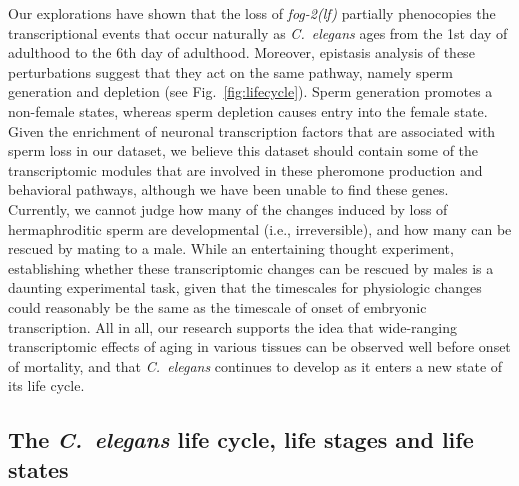 \documentclass[10pt,letterpaper,twocolumn]{article}
\newcommand{\cel}{\emph{C.~elegans}}
\newcommand{\fog}{\emph{\mbox{fog-2(lf)}}}
\begin{document}
Our explorations have shown that the loss of \fog{} partially phenocopies the
transcriptional events that occur naturally as \cel{} ages from the 1st day of
adulthood to the 6th day of adulthood. Moreover, epistasis analysis of these
perturbations suggest that they act on the same pathway, namely sperm generation
and depletion (see Fig.~\ref{fig:lifecycle}). Sperm generation promotes a non-female
states, whereas sperm depletion causes entry into the female state. Given the
enrichment of neuronal transcription factors that are associated with sperm loss
in our dataset, we believe this dataset should contain some of the transcriptomic
modules that are involved in these pheromone production and behavioral pathways,
although we have been unable to find these genes. Currently, we cannot judge how
many of the changes induced by loss of hermaphroditic sperm are developmental
(i.e., irreversible), and how many can be rescued by mating to a male.
While an entertaining thought experiment, establishing whether these transcriptomic
changes can be rescued by males is a daunting experimental task, given that the
timescales for physiologic changes could reasonably be the same as the timescale
of onset of embryonic transcription. All in all, our research supports the idea
that wide-ranging transcriptomic effects of aging in various tissues can be
observed well before onset of mortality, and that \cel{} continues to develop as
it enters a new state of its life cycle.

\subsection*{The \cel{} life cycle, life stages and life states}
\end{document}
